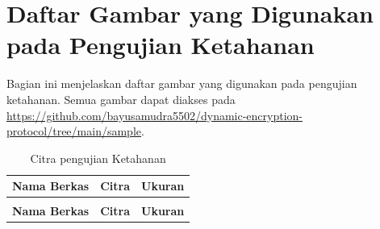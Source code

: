 \chapter{{{Daftar Gambar yang Digunakan pada Pengujian Ketahanan}}} 
\label{appendix:image.test}


Bagian ini menjelaskan daftar gambar yang digunakan pada pengujian ketahanan. Semua gambar dapat diakses pada \url{https://github.com/bayusamudra5502/dynamic-encryption-protocol/tree/main/sample}.

\begin{longtable}{|c|p{5.5cm}|c|}
  \caption{Citra pengujian Ketahanan} \label{tab:image.test} \\ 
  \hline
  \textbf{Nama Berkas} & \textbf{Citra} & \textbf{Ukuran}  \\ \hline
  
  \endfirsthead
  \caption[]{Citra pengujian Ketahanan} \\
  
  \hline
  \textbf{Nama Berkas} & \textbf{Citra} & \textbf{Ukuran}  \\ \hline
  \endhead


\end{longtable}
